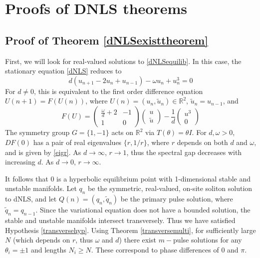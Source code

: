\documentclass[12pt]{article}
\def\R{{\mathbb R}}
\begin{document}
\section{Proofs of DNLS theorems}

\subsection{Proof of Theorem \ref{dNLSexisttheorem}}

First, we will look for real-valued solutions to \eqref{dNLSequilib}. In this case, the stationary equation \eqref{dNLS} reduces to
\begin{equation*}
d(u_{n+1} - 2 u_n + u_{n-1}) - \omega u_n + u_n^3 = 0
\end{equation*}
For $d \neq 0$, this is equivalent to the first order difference equation $U(n+1) = F(U(n))$, where $U(n) = (u_n, \tilde{u}_n) \in \R^2$, $\tilde{u}_n = u_{n-1}$, and 
\begin{equation}\label{dnlsdiffR2}
F(U) = 
\begin{pmatrix}
\frac{\omega}{d} + 2 & -1 \\
1 & 0
\end{pmatrix}
\begin{pmatrix}
u \\ \tilde{u}
\end{pmatrix}
- \frac{1}{d} 
\begin{pmatrix}
u^3 \\ 0
\end{pmatrix}
\end{equation}
The symmetry group $G = \{ 1, -1\}$ acts on $\R^2$ via $T(\theta) = \theta I$. For $d, \omega > 0$, $DF(0)$ has a pair of real eigenvalues $\{r, 1/r \}$, where $r$ depends on both $d$ and $\omega$, and is given by \eqref{eigr}. As $d \rightarrow \infty$, $r \rightarrow 1$, thus the spectral gap decreases with increasing $d$. As $d \rightarrow 0$, $r \rightarrow \infty$.

It follows that 0 is a hyperbolic equilibrium point with 1-dimensional stable and unstable manifolds. Let $q_n$ be the symmetric, real-valued, on-site soliton solution to dNLS, and let $Q(n) = (q_n, \tilde{q}_n)$ be the primary pulse solution, where $\tilde{q}_n = q_{n-1}$. Since the variational equation does not have a bounded solution, the stable and unstable manifolds intersect transversely. Thus we have satisfied Hypothesis \ref{transversehyp}. Using Theorem \ref{transversemulti}, for sufficiently large $N$ (which depends on $r$, thus $\omega$ and $d$) there exist $m-$pulse solutions for any $\theta_i = \pm 1$ and lengths $N_i \geq N$. These correspond to phase differences of $0$ and $\pi$.
\end{document}
